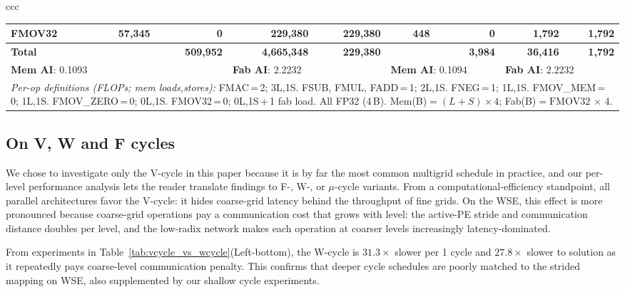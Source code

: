 \documentclass[conference]{IEEEtran}
\begin{document}
\begin{table}[t]
\begin{tabular}{ccc}
\begin{minipage}[t]{0.68\textwidth}
\begin{tabular}{|l||r|r|r|r||r|r|r|r|}
            FMOV32     &   57,345 &         0 &    229,380 & 229,380 &      448 &        0 &      1,792 &   1,792 \\ \hline \hline
            \textbf{Total} & & \textbf{509,952} & \textbf{4,665,348} & \textbf{229,380} & & \textbf{3,984} & \textbf{36,416} & \textbf{1,792} \\ \hline \hline
            \multicolumn{3}{|l||}{\textbf{Mem AI}: 0.1093} & \multicolumn{2}{l||}{\textbf{Fab AI}: 2.2232} & \multicolumn{2}{l|}{\textbf{Mem AI}: 0.1094} & \multicolumn{2}{l|}{\textbf{Fab AI}: 2.2232} \\ \hline \hline
            \multicolumn{9}{|p{0.66\textwidth}|}{\scriptsize\textit{Per-op definitions (FLOPs; mem loads,stores):}
            FMAC\,=\,2; 3L,1S.\;
            FSUB, FMUL, FADD\,=\,1; 2L,1S.\;
            FNEG\,=\,1; 1L,1S.\;
            FMOV\_MEM\,=\,0; 1L,1S.\;
            FMOV\_ZERO\,=\,0; 0L,1S.\;
            FMOV32\,=\,0; 0L,1S\,+\,1 fab load.\;
            All FP32 (4\,B). Mem(B)${}=(L{+}S){\times}4$; Fab(B)${}=\text{FMOV32}\,{\times}\,4$.} \\ \hline
        \end{tabular}
    \end{minipage}
\end{tabular}
\end{table}
        {
        \subsection{On V, W and F cycles}
            We chose to investigate only the V-cycle in this paper because it is by far the most common multigrid schedule in practice, and our per-level performance analysis lets the reader translate findings to F-, W-, or $\mu$-cycle variants. From a computational-efficiency standpoint, all parallel architectures favor the V-cycle: it hides coarse-grid latency behind the throughput of fine grids. On the WSE, this effect is more pronounced because coarse-grid operations pay a communication cost that grows with level: the active-PE stride and communication distance doubles per level, %
            and the low-radix network makes each operation at coarser levels %
            increasingly latency-dominated.
            
            From experiments in Table~\ref{tab:vcycle_vs_wcycle}(Left-bottom), the W-cycle is $31.3\times$ slower per 1 cycle and $27.8\times$ slower to solution as it repeatedly pays coarse-level communication penalty. This confirms that deeper cycle schedules are poorly matched to the strided mapping on WSE, also supplemented by our shallow cycle experiments.

        }
\end{document}
